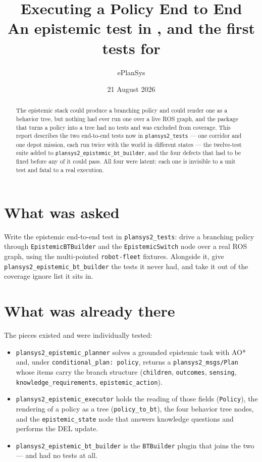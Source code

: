 \documentclass[11pt,a4paper]{article}
\title{Executing a Policy End to End\\[2mm]
\large An epistemic test in \code{plansys2\_tests}, and the first tests for
\code{plansys2\_epistemic\_bt\_builder}}
\author{ePlanSys}
\date{21 August 2026}
\newcommand{\code}[1]{\texttt{\small #1}}
\begin{document}
\maketitle

\begin{abstract}
The epistemic stack could produce a branching policy and could render one as a
behavior tree, but nothing had ever run one over a live ROS graph, and the
package that turns a policy into a tree had no tests and was excluded from
coverage. This report describes the two end-to-end tests now in
\code{plansys2\_tests} --- one corridor and one depot mission, each run twice
with the world in different states --- the twelve-test suite added to
\code{plansys2\_epistemic\_bt\_builder}, and the four defects that had to be
fixed before any of it could pass. All four were latent: each one is invisible
to a unit test and fatal to a real execution.
\end{abstract}

\section{What was asked}

Write the epistemic end-to-end test in \code{plansys2\_tests}: drive a
branching policy through \code{EpistemicBTBuilder} and the
\code{EpistemicSwitch} node over a real ROS graph, using the multi-pointed
\code{robot-fleet} fixtures. Alongside it, give
\code{plansys2\_epistemic\_bt\_builder} the tests it never had, and take it out
of the coverage ignore list it sits in.

\section{What was already there}

The pieces existed and were individually tested:

\begin{itemize}
  \item \code{plansys2\_epistemic\_planner} solves a grounded epistemic task
    with AO* and, under \code{conditional\_plan: policy}, returns a
    \code{plansys2\_msgs/Plan} whose items carry the branch structure
    (\code{children}, \code{outcomes}, \code{sensing},
    \code{knowledge\_requirements}, \code{epistemic\_action}).
  \item \code{plansys2\_epistemic\_executor} holds the reading of those fields
    (\code{Policy}), the rendering of a policy as a tree (\code{policy\_to\_bt}),
    the four behavior tree nodes, and the \code{epistemic\_state} node that
    answers knowledge questions and performs the DEL update.
  \item \code{plansys2\_epistemic\_bt\_builder} is the \code{BTBuilder} plugin
    that joins the two --- and had no tests at all.
\end{itemize}
\end{document}
